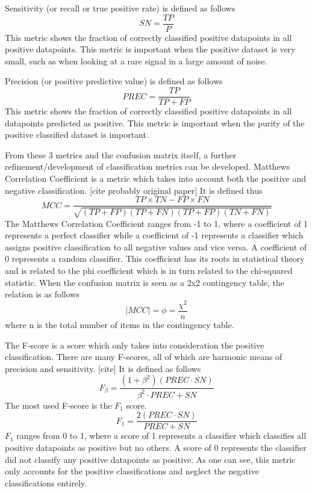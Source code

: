 \documentclass[a4paper,fleqn,usenatbib]{mnras}
\begin{document}
  Sensitivity (or recall or true positive rate) is defined as follows
  \begin{equation}
  SN=\frac{TP}{P}	
  \end{equation}
This metric shows the fraction of correctly classified positive datapoints in all positive datapoints. This metric is important when the positive dataset is very small, such as when looking at a rare signal in a large amount of noise. 

  Precision (or positive predictive value) is defined as follows
  \begin{equation}
  PREC=\frac{TP}{TP+FP}	
  \end{equation}
This metric shows the fraction of correctly classified positive datapoints in all datapoints predicted as positive. This metric is important when the purity of the positive classified dataset is important.

From these 3 metrics and the confusion matrix itself, a further refinement/development of classification metrics can be developed. Matthews Correlation Coefficient is a metric which takes into account both the positive and negative classification. [cite probably original paper] It is defined thus
\begin{equation}
MCC = \frac{TP\times TN - FP\times FN}{\sqrt{(TP+FP)(TP+FN)(TP+FP)(TN+FN)}}	
\end{equation}
The Matthews Correlation Coefficient ranges from -1 to 1, where a coefficient of 1 represents a perfect classifier while a coefficient of -1 represents a classifier which assigns positive classification to all negative values and vice versa. A coefficient of 0 represents a random classifier. This coefficient has its roots in statistical theory and is related to the phi coefficient which is in turn related to the chi-squared statistic. When the confusion matrix is seen as a 2x2 contingency table, the relation is as follows
\begin{equation}
|MCC| = \phi = \frac{\chi^2}{n}
\end{equation}
where n is the total number of items in the contingency table. 

The F-score is a score which only takes into consideration the positive classification. There are many F-scores, all of which are harmonic means of precision and sensitivity. [cite] It is defined as follows
\begin{equation}
F_\beta = \frac{(1+\beta^2)(PREC\cdot SN)}{\beta^2 \cdot PREC + SN}
\end{equation}
The most used F-score is the $F_1$ score. 
\begin{equation}
F_1 = \frac{2(PREC\cdot SN)}{PREC + SN}
\end{equation}
$F_1$ ranges from 0 to 1, where a score of 1 represents a classifier which classifies all positive datapoints as positive but no others. A score of 0 represents the classifier did not classify any positive datapoints as positive. As one can see, this metric only accounts for the positive classifications and neglect the negative classifications entirely. 
\end{document}
